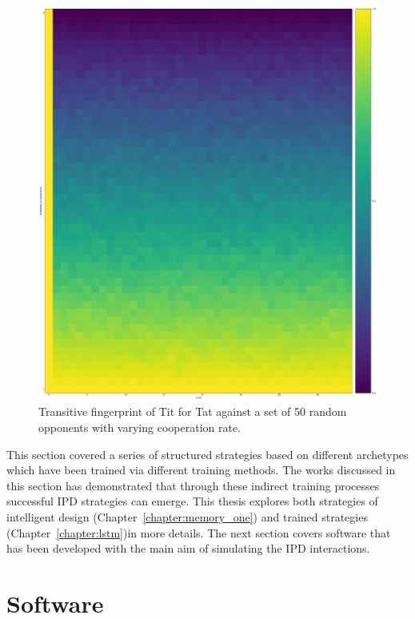 \begin{figure}[!hbtp]
    \centering
    \includegraphics[height=.3\textheight]{src/chapters/02/img/Tit_for_Tat_fingerprint}
    \caption{Transitive fingerprint of Tit for Tat against a set of 50 random opponents
    with varying cooperation rate.}
    \label{fig:transitive_fingerprinting}
\end{figure}

This section covered a series of structured strategies based on different
archetypes which have been trained via different training methods. The works
discussed in this section has demonstrated that through these indirect
training processes successful IPD strategies can emerge. This thesis explores
both strategies of intelligent design (Chapter~\ref{chapter:memory_one}) and
trained strategies (Chapter~\ref{chapter:lstm})in more details. The next section
covers software that has been developed with the main aim of simulating the IPD
interactions.

\section{Software}\label{section:software}

